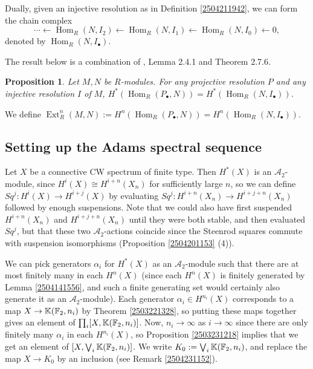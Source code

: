 \documentclass[11pt, titlepage]{article} %
\def\bb{\ensuremath\mathbb}
\def\A{\ensuremath{\mathscr{A}_2}}
\DeclareMathOperator{\Ext}{Ext}
\DeclareMathOperator{\Hom}{Hom}
\def\textcolour{\textcolor}
\numberwithin{equation}{subsection}
\theoremstyle{plain}
\newtheorem{proposition}[theorem]{Proposition}
\theoremstyle{definition}
\begin{document}
Dually, given an injective resolution as in Definition \ref{2504211942}, we can form the chain complex
\[\cdots \leftarrow \Hom_R(N, I_2) \leftarrow \Hom_R(N, I_1) \leftarrow \Hom_R(N, I_0)\leftarrow 0,\]
denoted by \(\Hom_R(N, I_\bullet)\).

The result below is a combination of \autocite{weibel}, Lemma 2.4.1 and Theorem 2.7.6. 

\begin{proposition}
Let \(M, N\) be \(R\)-modules. For any projective resolution \(P\) and any injective resolution \(I\) of \(M\), \(H^*(\Hom_R(P_\bullet, N))=H^*(\Hom_R(N,I_\bullet))\).
\end{proposition}

We define \(\Ext^{n}_R(M,N):=H^n(\Hom_R(P_\bullet, N))=H^n(\Hom_R(N, I_\bullet))\). 

\subsection{Setting up the Adams spectral sequence}\label{2504291248}

Let \(X\) be a connective CW spectrum of finite type. Then \(H^*(X)\) is an \(\A\)-module, since \(H^i(X)\cong H^{i+n}(X_n)\) for sufficiently large \(n\), so we can define \(Sq^j : H^i(X)\to H^{i+j}(X)\) by evaluating \(Sq^j : H^{i+n}(X_n)\to H^{i+j+n}(X_n)\) followed by enough suspensions. Note that we could also have first suspended \(H^{i+n}(X_n)\) and \(H^{i+j+n}(X_n)\) until they were both stable, and then evaluated \(Sq^j\), but that these two \(\A\)-actions coincide since the Steenrod squares commute with suspension isomorphisms (Proposition \ref{2504201153} (4)). %

We can pick generators \(\alpha_i\) for \(H^*(X)\) as an \(\mathscr{A}_2\)-module such that there are at most finitely many in each \(H^n(X)\) (since each \(H^n(X)\) is finitely generated by Lemma  \ref{2504141556}, and such a finite generating set would certainly also generate it as an \(\A\)-module). Each generator \(\alpha_i\in H^{n_i}(X)\) corresponds to a map \(X \to \bb{K}(\bb{F}_2, n_i)\) by Theorem \ref{2503221328}, so putting these maps together gives an element of \(\prod_i [X, \bb{K}(\bb{F}_2, n_i)]\). Now, \(n_i \to\infty\) as \(i\to \infty\) since there are only finitely many \(\alpha_i\) in each \(H^{n_i}(X)\), so Proposition \ref{2503231218} implies that we get an element of \([X, \bigvee_i \bb{K}(\bb{F}_2, n_i)]\).  We write \(K_0 := \bigvee_i \bb{K}(\bb{F}_2, n_i)\), and replace the map \(X \to K_0\) by an inclusion (see Remark \ref{2504231152}).
\end{document}
